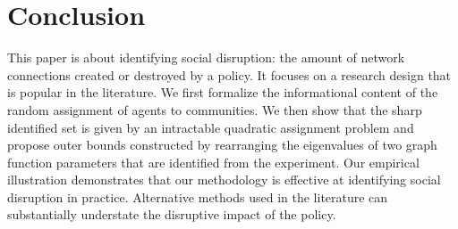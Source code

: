 \documentclass[12pt]{article}
\theoremstyle{definition}
\begin{document}
%






\section{Conclusion}
This paper is about identifying social disruption: the amount of network connections created or destroyed by a policy. It focuses on a research design that is popular in the literature. We first formalize the informational content of the random assignment of agents to communities. We then show that the sharp identified set is given by an intractable quadratic assignment problem and propose outer bounds constructed by rearranging the eigenvalues of two graph function parameters that are identified from the experiment. Our empirical illustration demonstrates that our methodology is effective at identifying social disruption in practice. Alternative methods used in the literature can substantially understate the disruptive impact of the policy.     
\end{document}
